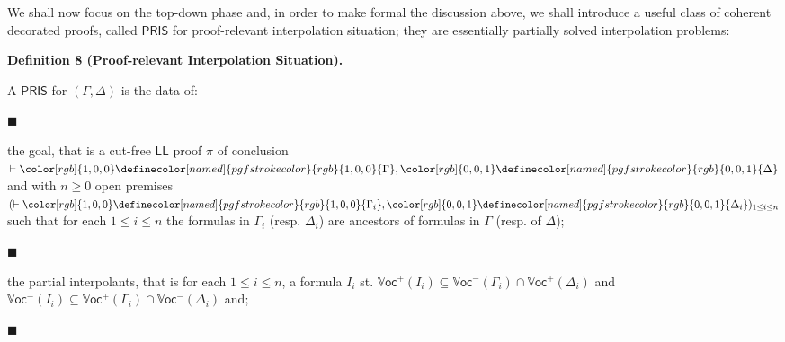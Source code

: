 \documentclass[10pt,a4paper]{article}
\begin{document}
 
We shall now focus on the top-down phase and, in order to make formal the discussion above, we shall introduce a useful class of coherent decorated proofs, called $\mathsf{PRIS}$ for proof-relevant interpolation situation; they are essentially partially solved interpolation problems:\par
 
 
 
\par\medskip\noindent\textbf{Definition 8 (Proof-relevant Interpolation Situation).}\par
 
 
A $\mathsf{PRIS}$ for $(\Gamma,\Delta)$ is the data of:\par
  
\par\noindent  $\blacksquare$ 
 
the goal, that is a cut-free $\mathsf{LL}$ proof $\pi$ of conclusion $\vdash{\color[rgb]{1,0,0}\definecolor[named]{pgfstrokecolor}{rgb}{1,0,0}{{\Gamma}}},{\color[rgb]{0,0,1}\definecolor[named]{pgfstrokecolor}{rgb}{0,0,1}{{\Delta}}}$ and with $n\geq 0$ open premises $(\vdash{\color[rgb]{1,0,0}\definecolor[named]{pgfstrokecolor}{rgb}{1,0,0}{{\Gamma_{i}}}},{\color[rgb]{0,0,1}\definecolor[named]{pgfstrokecolor}{rgb}{0,0,1}{{\Delta_{i}}}})_{1\leq i\leq n}$ such that for each $1\leq i\leq n$ the formulas in $\Gamma_{i}$ (resp. $\Delta_{i}$) are ancestors of formulas in $\Gamma$ (resp. of $\Delta$);\par
 
 
 
\par\noindent  $\blacksquare$ 
 
the partial interpolants, that is for each $1\leq i\leq n$, a formula $I_{i}$ st. $\mathbb{V}\mathsf{oc}^{+}{(I_{i})}\subseteq\mathbb{V}\mathsf{oc}^{-}{(\Gamma_{i})}\cap\mathbb{V}\mathsf{oc}^{+}{(\Delta_{i})}$ and $\mathbb{V}\mathsf{oc}^{-}{(I_{i})}\subseteq\mathbb{V}\mathsf{oc}^{+}{(\Gamma_{i})}\cap\mathbb{V}\mathsf{oc}^{-}{(\Delta_{i})}$ and;\par
 
 
 
\par\noindent  $\blacksquare$ 
 
\end{document}
